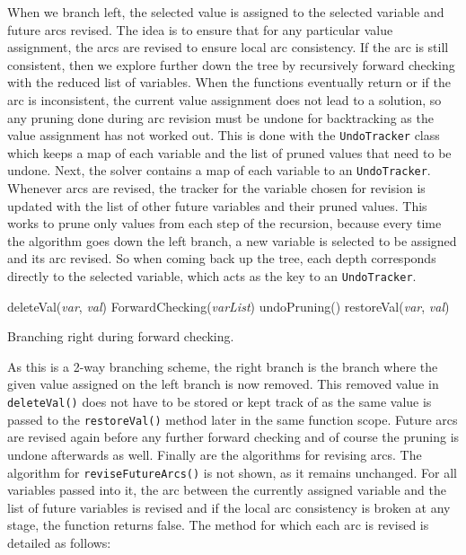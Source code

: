 \documentclass{article}
\begin{document}
When we branch left, the selected value is assigned to the selected variable and future arcs revised. The idea is to ensure that for any particular value assignment, the arcs are revised to ensure local arc consistency. If the arc is still consistent, then we explore further down the tree by recursively forward checking with the reduced list of variables.
\n
When the functions eventually return or if the arc is inconsistent, the current value assignment does not lead to a solution, so any pruning done during arc revision must be undone for backtracking as the value assignment has not worked out. This is done with the \texttt{UndoTracker} class which keeps a map of each variable and the list of pruned values that need to be undone. Next, the solver contains a map of each variable to an \texttt{UndoTracker}. Whenever arcs are revised, the tracker for the variable chosen for revision is updated with the list of other future variables and their pruned values. This works to prune only values from each step of the recursion, because every time the algorithm goes down the left branch, a new variable is selected to be assigned and its arc revised. So when coming back up the tree, each depth corresponds directly to the selected variable, which acts as the key to an \texttt{UndoTracker}. 

\begin{algorithm}[H]
\begin{algorithmic}[1]
\State deleteVal(\textit{var}, \textit{val})
		\State ForwardChecking(\textit{varList})
	\EndIf
	\State undoPruning()
\EndIf
\State restoreVal(\textit{var}, \textit{val})
\EndProcedure
\end{algorithmic}
\caption{Branching right during forward checking.}
\end{algorithm}
As this is a 2-way branching scheme, the right branch is the branch where the given value assigned on the left branch is now removed. This removed value in \texttt{deleteVal()} does not have to be stored or kept track of as the same value is passed to the \texttt{restoreVal()} method later in the same function scope. Future arcs are revised again before any further forward checking and of course the pruning is undone afterwards as well.
\n
Finally are the algorithms for revising arcs. The algorithm for \texttt{reviseFutureArcs()} is not shown, as it remains unchanged. For all variables passed into it, the arc between the currently assigned variable and the list of future variables is revised and if the local arc consistency is broken at any stage, the function returns false. The method for which each arc is revised is detailed as follows:
\end{document}
